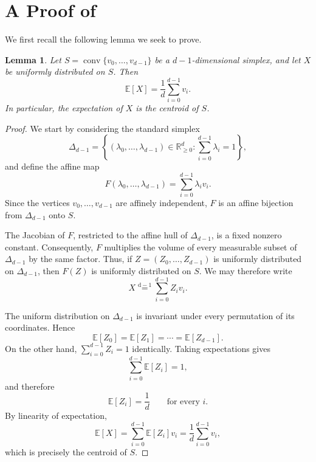 \documentclass[11pt]{article}
\newtheorem{lemma}[theorem]{Lemma}
\let \cref \Cref
\begin{document}
\printbibliography

\appendix

\section{A Proof of \cref{lem:simplexExpectation}}

We first recall the following lemma we seek to prove.

\begin{lemma}
Let $S=\operatorname{conv}\{v_0,\ldots,v_{d-1}\}$
be a $d-1$-dimensional simplex, and let $X$ be uniformly distributed on $S$. Then
\[
\mathbb{E}[X]=\frac{1}{d}\sum_{i=0}^{d-1} v_i.
\]
In particular, the expectation of $X$ is the centroid of $S$.
\end{lemma}

\begin{proof}

We start by considering the standard simplex
\[
\Delta_{d-1}
=
\left\{
(\lambda_0,\ldots,\lambda_{d-1})\in\mathbb{R}_{\geq 0}^{d}
:
\sum_{i=0}^{d-1}\lambda_i=1
\right\},
\]
and define the affine map
\[
F(\lambda_0,\ldots,\lambda_{d-1})
=
\sum_{i=0}^{d-1}\lambda_i v_i.
\]
Since the vertices $v_0,\ldots,v_{d-1}$ are affinely independent, $F$ is an affine bijection from $\Delta_{d-1}$ onto $S$.

The Jacobian of $F$, restricted to the affine hull of $\Delta_{d-1}$, is a fixed nonzero constant. Consequently, $F$ multiplies the volume of every measurable subset of $\Delta_{d-1}$ by the same factor. Thus, if $Z=(Z_0,\ldots,Z_{d-1})$ is uniformly distributed on $\Delta_{d-1}$, then $F(Z)$ is uniformly distributed on $S$. We may therefore write
\[
X\stackrel{\mathrm{d-1}}{=}\sum_{i=0}^{d-1}Z_i v_i.
\]

The uniform distribution on $\Delta_{d-1}$ is invariant under every
permutation of its coordinates. Hence
\[
\mathbb{E}[Z_0]
=
\mathbb{E}[Z_1]
=
\cdots
=
\mathbb{E}[Z_{d-1}].
\]
On the other hand, $\sum_{i=0}^{d-1}Z_i=1$ identically. Taking expectations gives
\[
\sum_{i=0}^{d-1}\mathbb{E}[Z_i]=1,
\]
and therefore
\[
\mathbb{E}[Z_i]=\frac{1}{d}
\qquad\text{for every }i.
\]
By linearity of expectation,
\[
\mathbb{E}[X]
=
\sum_{i=0}^{d-1}\mathbb{E}[Z_i]v_i
=
\frac{1}{d}\sum_{i=0}^{d-1} v_i,
\]
which is precisely the centroid of $S$.
\end{proof}
\end{document}
